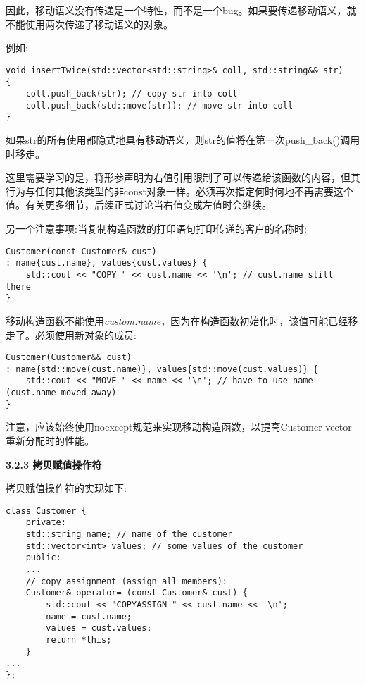 因此，移动语义没有传递是一个特性，而不是一个bug。如果要传递移动语义，就不能使用两次传递了移动语义的对象。\par

例如:\par

\begin{lstlisting}[caption={}]
void insertTwice(std::vector<std::string>& coll, std::string&& str)
{
	coll.push_back(str); // copy str into coll
	coll.push_back(std::move(str)); // move str into coll
}
\end{lstlisting}

如果str的所有使用都隐式地具有移动语义，则str的值将在第一次push\_back()调用时移走。\par

这里需要学习的是，将形参声明为右值引用限制了可以传递给该函数的内容，但其行为与任何其他该类型的非const对象一样。必须再次指定何时何地不再需要这个值。有关更多细节，后续正式讨论当右值变成左值时会继续。\par

另一个注意事项:当复制构造函数的打印语句打印传递的客户的名称时:\par

\begin{lstlisting}[caption={}]
Customer(const Customer& cust)
: name{cust.name}, values{cust.values} {
	std::cout << "COPY " << cust.name << '\n'; // cust.name still there
}
\end{lstlisting}

移动构造函数不能使用\textit{custom.name}，因为在构造函数初始化时，该值可能已经移走了。必须使用新对象的成员:\par

\begin{lstlisting}[caption={}]
Customer(Customer&& cust)
: name{std::move(cust.name)}, values{std::move(cust.values)} {
	std::cout << "MOVE " << name << '\n'; // have to use name (cust.name moved away)
}
\end{lstlisting}

注意，应该始终使用noexcept规范来实现移动构造函数，以提高Customer vector重新分配时的性能。\par

\hspace*{\fill} \par %
\textbf{3.2.3 拷贝赋值操作符}

拷贝赋值操作符的实现如下:\par

\begin{lstlisting}[caption={}]
class Customer {
	private:
	std::string name; // name of the customer
	std::vector<int> values; // some values of the customer
	public:
	...
	// copy assignment (assign all members):
	Customer& operator= (const Customer& cust) {
		std::cout << "COPYASSIGN " << cust.name << '\n';
		name = cust.name;
		values = cust.values;
		return *this;
	}
...
};
\end{lstlisting}

